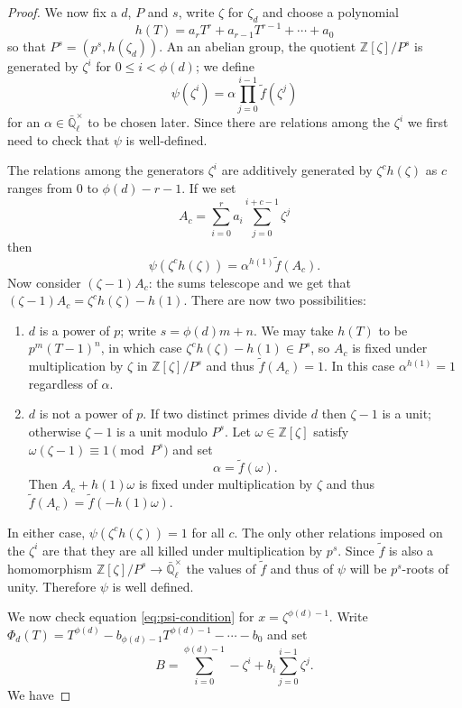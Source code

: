 \documentclass[11pt]{amsart}
\theoremstyle{plain}
\theoremstyle{definition}
\theoremstyle{remark}
\newcommand{\ZZ}{{\mathbb{Z}}}
\newcommand{\EE}{\mathbb{\bar Q}_\ell}
\begin{document}
\begin{proof}
We now fix a $d$, $P$ and $s$, write $\zeta$ for $\zeta_d$ and choose a polynomial
$$h(T) = a_rT^r + a_{r-1}T^{r-1} + \cdots + a_0$$
so that $P^s = (p^s, h(\zeta_d))$.
An an abelian group, the quotient $\ZZ[\zeta] / P^s$ is generated by $\zeta^i$ for $0 \le i < \phi(d)$; we define
\begin{equation} \label{eq:psi-def}
\psi(\zeta^i) = \alpha \prod_{j=0}^{i-1} \tilde{f}(\zeta^j)
\end{equation}
for an $\alpha \in \EE^\times$ to be chosen later.  Since there are relations among the $\zeta^i$ we first need to check that $\psi$ is well-defined.

The relations among the generators $\zeta^i$ are additively generated by $\zeta^ch(\zeta)$ as $c$ ranges from $0$ to $\phi(d)-r-1$.  If we set 
$$A_c = \sum_{i=0}^r a_i \sum_{j=0}^{i+c-1} \zeta^j$$
then
$$\psi(\zeta^ch(\zeta)) = \alpha^{h(1)} \tilde{f}(A_c).$$
Now consider $(\zeta - 1)A_c$: the sums telescope and we get that $(\zeta-1)A_c = \zeta^ch(\zeta) - h(1).$  There are now two possibilities:
\begin{enumerate}
\item $d$ is a power of $p$; write $s = \phi(d)m + n$.  We may take $h(T)$ to be $p^m(T-1)^n$, in which case $\zeta^ch(\zeta) - h(1) \in P^s$, so $A_c$ is fixed under multiplication by $\zeta$ in $\ZZ[\zeta]/P^s$ and thus $\tilde{f}(A_c) = 1$.  In this case $\alpha^{h(1)} = 1$ regardless of $\alpha$.
\item $d$ is not a power of $p$.  If two distinct primes divide $d$ then $\zeta - 1$ is a unit; otherwise $\zeta - 1$ is a unit modulo $P^s$.  Let $\omega \in \ZZ[\zeta]$ satisfy $\omega(\zeta - 1) \equiv 1 \pmod{P^s}$ and set
\begin{equation} \label{alpha-def}
\alpha = \tilde{f}(\omega).
\end{equation}
Then $A_c + h(1)\omega$ is fixed under multiplication by $\zeta$ and thus $\tilde{f}(A_c) = \tilde{f}(-h(1)\omega)$.
\end{enumerate}
In either case, $\psi(\zeta^ch(\zeta)) = 1$ for all $c$.  The only other relations imposed on the $\zeta^i$ are that they are all killed under multiplication by $p^s$.  Since $\tilde{f}$ is also a homomorphism $\ZZ[\zeta]/P^s \rightarrow \EE^\times$ the values of $\tilde{f}$ and thus of $\psi$ will be $p^s$-roots of unity.  Therefore $\psi$ is well defined.

We now check equation \ref{eq:psi-condition} for $x = \zeta^{\phi(d)-1}$.  Write $\Phi_d(T) = T^{\phi(d)} - b_{\phi(d)-1}T^{\phi(d)-1} - \cdots - b_0$ and set
$$B = \sum_{i=0}^{\phi(d)-1} -\zeta^i + b_i \sum_{j=0}^{i-1} \zeta^j.$$
We have


\end{proof}
\end{document}
